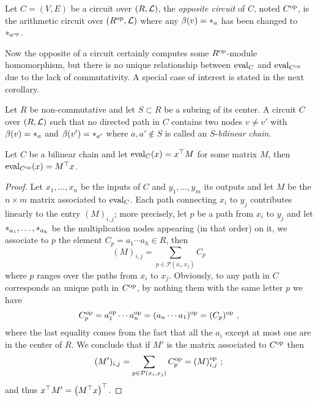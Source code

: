 \begin{definition}
  Let $C=(V,E)$ be a circuit over $(R,\mathcal{L})$, the \emph{opposite
    circuit} of $C$, noted $C^{\mathrm{op}}$, is the arithmetic circuit over
  $(R^{\mathrm{op}},\mathcal{L})$ where any $\beta(v)=*_{a}$ has been changed to $*_{a^{\mathrm{op}}}$.
\end{definition}

Now the opposite of a circuit certainly computes some $R^{\mathrm{op}}$-module
homomorphism, but there is no unique relationship between $\operatorname{eval}_C$
and $\operatorname{eval}_{C^{\mathrm{op}}}$ due to the lack of commutativity. A special case
of interest is stated in the next corollary.

\begin{definition}
  Let $R$ be non-commutative and let $S\subset R$ be a subring of its
  center. A circuit $C$ over $(R,\mathcal{L})$ such that no directed path
  in $C$ contains two nodes $v\ne v'$ with $\beta(v)=*_{a}$ and
  $\beta(v')=*_{a'}$ where $a,a'\not\in S$ is called an
  $S$-\emph{bilinear chain}.
\end{definition}

\begin{corollary}
  Let $C$ be a bilinear chain and let $\operatorname{eval}_C(x)=x^\top M$ for some
  matrix $M$, then $\operatorname{eval}_{C^{\mathrm{op}}}(x)=M^\top x$.
\end{corollary}
\begin{proof}
  Let $x_1,\ldots,x_n$ be the inputs of $C$ and $y_1,\ldots,y_m$ its
  outputs and let $M$ be the $n\times m$ matrix associated to
  $\operatorname{eval}_C$. Each path connecting $x_i$ to $y_j$ contributes linearly
  to the entry $(M)_{i,j}$; more precisely, let $p$ be a path from
  $x_i$ to $y_j$ and let $*_{a_1},\ldots,*_{a_h}$ be the
  multiplication nodes appearing (in that order) on it, we associate
  to $p$ the element $C_p=a_1\cdots a_h\in R$, then
  \begin{equation}
    (M)_{i,j}=\sum_{p\in\mathcal{P}(x_i,x_j)}C_p
  \end{equation}
  where $p$ ranges over the paths from $x_i$ to $x_j$. Obviously, to
  any path in $C$ corresponds an unique path in $C^{\mathrm{op}}$, by nothing
  them with the same letter $p$ we have
  \begin{equation}
    C_p^{\mathrm{op}}=a_1^{\mathrm{op}}\cdots a_n^{\mathrm{op}}=(a_n\cdots a_1)^{\mathrm{op}}=(C_p)^{\mathrm{op}}
    \text{ ,}
  \end{equation}
  where the last equality comes from the fact that all the $a_i$
  except at most one are in the center of $R$. We conclude that if
  $M'$ is the matrix associated to $C^{\mathrm{op}}$ then
  \begin{equation}
    (M')_{i,j}=\sum_{p\in\mathcal{P}(x_i,x_j)}C_p^{\mathrm{op}}=(M)_{i,j}^{\mathrm{op}}
    \text{ ;}
  \end{equation}
  and thus $x^\top M'=\left(M^\top x\right)^\top$.
\end{proof}



